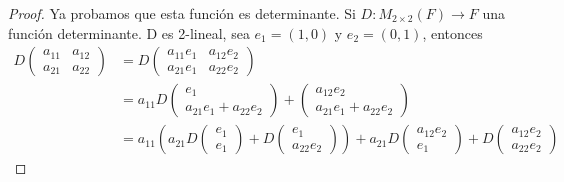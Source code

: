 \documentclass[12pt,a4paper]{book}
\newcommand{\parentesis}[1]{\left(#1\right)}
\begin{document}
    \begin{proof}
        Ya probamos que esta función es determinante. Si
        $D:M_{2\times2}(F)\to F$ una función determinante.
        D es 2-lineal, sea $e_{1}=(1,0)$ y $e_{2}=(0,1)$, entonces
        \begin{align*}
            D
            \begin{pmatrix}
                a_{11} & a_{12}\\
                a_{21} & a_{22}
            \end{pmatrix}
            &=
            D
            \begin{pmatrix}
                a_{11}e_{1} & a_{12}e_{2}\\
                a_{21}e_{1} & a_{22}e_{2}
            \end{pmatrix}
            \\
            &=a_{11}D
            \begin{pmatrix}
                e_{1}\\
                a_{21}e_{1}+a_{22}e_{2}
            \end{pmatrix}
            +
            \begin{pmatrix}
                a_{12}e_{2}\\
                a_{21}e_{1}+a_{22}e_{2}
            \end{pmatrix}\\
            &=a_{11}\parentesis{
                a_{21}D
                \begin{pmatrix}
                    e_{1}\\
                    e_{1}
                \end{pmatrix}
                +D
                \begin{pmatrix}
                   e_{1}\\
                   a_{22}e_{2} 
                \end{pmatrix}
            }+a_{21}D
            \begin{pmatrix}
                a_{12}e_{2}\\
                e_{1}
            \end{pmatrix}
            +D
            \begin{pmatrix}
                a_{12}e_{2}\\
                a_{22}e_{2}
            \end{pmatrix}
        \end{align*}
    \end{proof}
\end{document}
